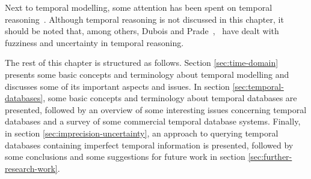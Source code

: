 Next to temporal modelling, some attention has been spent on temporal reasoning~\cite{Allen83}. Although temporal reasoning is not discussed in this chapter, it should be noted that, among others, Dubois and Prade~\cite{Dubois:jucs_9_9:fuzziness_and_uncertainty_in},~\cite{Dubois89} have dealt with fuzziness and uncertainty in temporal reasoning.

The rest of this chapter is structured as follows. Section \ref{sec:time-domain} presents some basic concepts and terminology about temporal modelling and discusses some of its important aspects and issues. In section \ref{sec:temporal-databases}, some basic concepts and terminology about temporal databases are presented, followed by an overview of some interesting issues concerning temporal databases and a survey of some commercial temporal database systems. Finally, in section \ref{sec:imprecision-uncertainty}, an approach to querying temporal databases containing imperfect temporal information is presented, followed by some conclusions and some suggestions for future work in section \ref{sec:further-research-work}.





